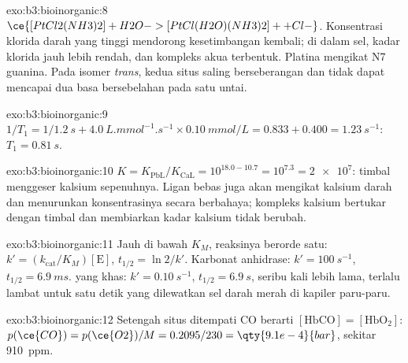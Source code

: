 \begin{solution}{exo:b3:bioinorganic:8}
$\ce{[PtCl2(NH3)2] + H2O -> [PtCl(H2O)(NH3)2]+ + Cl-}$. Konsentrasi klorida darah yang tinggi
mendorong kesetimbangan kembali; di dalam sel, kadar klorida jauh lebih rendah, dan kompleks
akua terbentuk. Platina mengikat N7 guanina. Pada isomer \textit{trans}, kedua
situs  saling berseberangan dan tidak dapat mencapai dua basa bersebelahan pada satu
untai.
\end{solution}

\begin{solution}{exo:b3:bioinorganic:9}
$1/T_1 = 1/\qty{1.2}{s} + \qty{4.0}{L.mmol^{-1}.s^{-1}} \times \qty{0.10}{mmol/L} = 0.833 + 0.400 = \qty{1.23}{s^{-1}}$: $T_1 = \qty{0.81}{s}$.
\end{solution}

\begin{solution}{exo:b3:bioinorganic:10}
$K = K_{\mathrm{PbL}}/K_{\mathrm{CaL}} = 10^{18.0 - 10.7} = 10^{7.3} = \num{2e7}$: timbal menggeser kalsium sepenuhnya. Ligan
bebas juga akan mengikat kalsium darah dan menurunkan konsentrasinya secara
berbahaya; kompleks kalsium bertukar dengan timbal dan membiarkan kadar kalsium
tidak berubah.
\end{solution}

\begin{solution}{exo:b3:bioinorganic:11}
Jauh di bawah $K_M$, reaksinya berorde satu: $k' = (k_{\mathrm{cat}}/K_M)[\mathrm E]$, $t_{1/2} = \ln 2/k'$. Karbonat
anhidrase: $k' = \qty{100}{s^{-1}}$, $t_{1/2} = \qty{6.9}{ms}$.  yang khas: $k' = \qty{0.10}{s^{-1}}$, $t_{1/2} = \qty{6.9}{s}$, seribu
kali lebih lama, terlalu lambat untuk satu detik yang dilewatkan sel darah merah di kapiler paru-paru.
\end{solution}

\begin{solution}{exo:b3:bioinorganic:12}
Setengah situs ditempati CO berarti $[\mathrm{HbCO}] = [\mathrm{HbO_2}]$: $p(\ce{CO}) = p(\ce{O2})/M = 0.2095/230 = \qty{9.1e-4}{bar}$, sekitar
\qty{910}{ppm}.
\end{solution}

